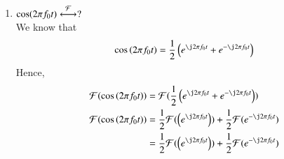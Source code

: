 \documentclass[journal,12pt,twocolumn]{IEEEtran}
\renewcommand\thesection{\arabic{section}}
\begin{document}
\begin{enumerate}[label=\thesection.\arabic*
		,ref=\thesection.\theenumi]
		\begin{align}
			g(t)&\system{F} \int_{-\infty}^{\infty}g(t)e^{-\j2\pi ft}\\
			g(t)e^{-j2\pi f_0t}&\system{F} \int_{-\infty}^{\infty}g(t)e^{-\j2\pi ft}e^{-j2\pi f_0t}\\
			g(t)e^{-j2\pi f_0t}&\system{F} G(f)e^{-j2\pi f_0 f}\\
		\end{align}
		From \eqref{eq:3.4.1},
		\begin{align}
			g(t-f_0)&\system{F}G(f)e^{-\j2\pi ft f_0}\\
			g(t)e^{-j2\pi f_0t}&\system{F} G(f)e^{-j2\pi f_0 f}\\
		\end{align}
		From \eqref{eq:inverseFourier},
		\begin{align}
			\delta(t)&\system{F}1\\
			1&\system{F}\delta(-f)=\delta(f)
		\end{align}
		Hence, 
		\begin{align}
			g(t-f_0)&\system{F} \delta((f+f_0))
		\end{align}
		\begin{align}
			g(t)e^{\j2\pi f_0t}&\system{F}\int_{-\infty}^{\infty}
			g(t)e^{-\j2\pi\brak{f-f_0}t}\, dt \\
			&=G(f-f_0)
			\label{eq:f-shift}
		\end{align}
		Hence,
		\begin{align}
			e^{-\j2\pi f_0t}\system{F}\delta(-(f+f_0)) = \delta(f+f_0)
			\label{eq:fourier-exp}
		\end{align}
		\item $\cos(2\pi f_0t)\overset{\mathcal{F}}{ \longleftrightarrow}?$\\
		\solution We know that 
		\begin{align}
			\cos\brak{2\pi f_0t} = \frac{1}{2}
			\brak{e^{\j2\pi f_0t} + e^{-\j2\pi f_0t}} \\
		\end{align}
		Hence,
		\begin{align}
			\mathcal{F}(\cos\brak{2\pi f_0t})&=\mathcal{F}(\frac{1}{2}
			\brak{e^{\j2\pi f_0t} + e^{-\j2\pi f_0t}})\\
			\mathcal{F}(\cos\brak{2\pi f_0t})&=\frac{1}{2} \mathcal{F}(
			\brak{e^{\j2\pi f_0t}})+ \frac{1}{2} \mathcal{F}(e^{-\j2\pi f_0t})\\
			&=\frac{1}{2} \mathcal{F}(
			\brak{e^{\j2\pi f_0t}})+ \frac{1}{2} \mathcal{F}(e^{-\j2\pi f_0t})\\

\end{align}
\end{enumerate}
\end{document}
